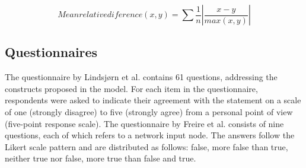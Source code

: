 \begin{equation}
   Mean relative diference(x,y) = \sum \frac{1}{n} \left | \frac{ x - y}{max(x,y)} \right |
\label{equation:mre}
\end{equation}

\subsection{Questionnaires}
\label{questionnaires}

The questionnaire by Lindsjørn et al. \cite{lindsjorn2016teamwork} contains 61 questions, addressing the constructs proposed in the model. For each item in the questionnaire, respondents were asked to indicate their agreement with the statement on a scale of one (strongly disagree) to five (strongly agree) from a personal point of view (five-point response scale). The questionnaire by Freire et al. \cite{freire2018bayesian} consists of nine questions, each of which refers to a network input node. The answers follow the Likert scale pattern and are distributed as follows: false, more false than true, neither true nor false, more true than false and true.